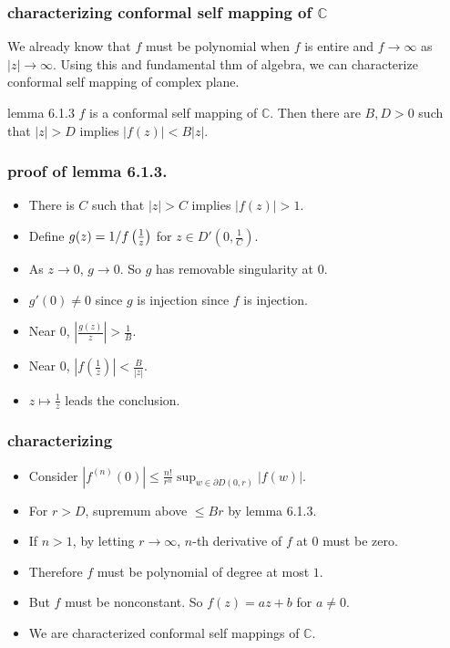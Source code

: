 \documentclass{beamer}
\begin{document}
\begin{frame}
	\frametitle{characterizing conformal self mapping of $\mathbb{C}$}


	 We already know that $f$ must be polynomial when $f$ is entire and $f \rightarrow \infty$ as $|z| \rightarrow \infty$. Using this and fundamental thm of algebra, we can characterize conformal self mapping of complex plane. \\
	\pause

	\begin{alertblock}{lemma 6.1.3}
		$f$ is a conformal self mapping of $\mathbb{C}$. Then there are $B, D >0$ such that $|z| > D$ implies $|f(z)| < B|z|$.
		
	\end{alertblock}

\end{frame}

\begin{frame}
	\frametitle{proof of lemma 6.1.3.}
	\begin{itemize}
		\item There is $C$ such that $|z|>C$ implies $|f(z)| >1$.
		\item Define $g(z) = 1/f\left( {1 \over z} \right)$ for $z \in D'(0, \frac{1}{C})$.
		\item As $z \rightarrow 0$, $g \rightarrow 0$. So $g$ has removable singularity at $0$.
		\item $g'(0) \ne 0$ since $g$ is injection since $f$ is injection.
		\item Near $0$, $\left | \frac{g(z)}{z} \right | > \frac{1}{B}$. 
		\item Near $0$, $\left | f(\frac{1}{z}) \right | < \frac{B}{|z|}$.
		\item $z \mapsto \frac{1}{z}$ leads the conclusion.
	\end{itemize}

\end{frame}

\begin{frame}
	\frametitle{characterizing}
	\begin{itemize}
		\item Consider $|f^{(n)}(0)| \leq \frac{n!}{r^n}\sup_{w \in \partial D(0, r)}|f(w)|$.
		\item For $r > D$, supremum above $\leq Br$ by lemma 6.1.3.
		\item If $n >1$, by letting $r \rightarrow \infty$, $n$-th derivative of $f$ at $0$ must be zero.
		\item Therefore $f$ must be polynomial of degree at most $1$.
		\item But $f$ must be nonconstant. So $f(z) = az + b $ for $a \ne 0$.
		\item We are characterized conformal self mappings of $\mathbb{C}$.
	\end{itemize}
\end{frame}
\end{document}

